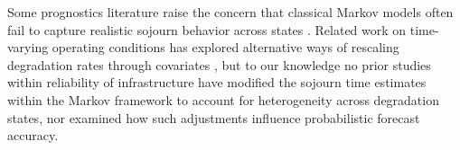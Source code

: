 \documentclass{article}
\begin{document}
Some prognostics literature raise the concern that classical Markov models often fail to capture realistic sojourn behavior across states \citep{AIZPURUA2022}. Related work on time-varying operating conditions has explored alternative ways of rescaling degradation rates through covariates \citep{liu2024a,bisgaard2024A}, but to our knowledge no prior studies within reliability of infrastructure have modified the sojourn time estimates within the Markov framework to account for heterogeneity across degradation states, nor examined how such adjustments influence probabilistic forecast accuracy.





%
\end{document}
